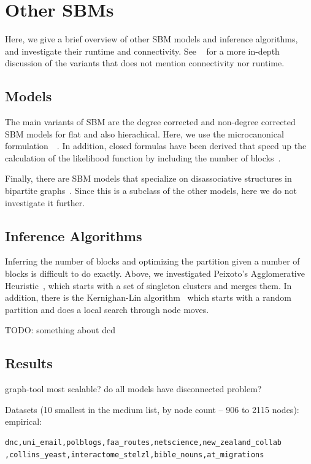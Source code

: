 \documentclass[aps,pre,superscriptaddress]{revtex4}
\begin{document}
\section{Other SBMs}

Here, we give a brief overview of other SBM models and inference algorithms, and investigate their runtime and connectivity.
See ~\cite{funke19-04} for a more in-depth discussion of the variants that does not mention connectivity nor runtime.

\subsection*{Models}

The main variants of SBM are the degree corrected and non-degree corrected SBM models for flat and also hierachical.
Here, we use the microcanonical formulation~\cite{peixoto17-01}~\cite{peixoto14-03}.
In addition, closed formulas have been derived that speed up the calculation of the likelihood function by including the number of blocks~\cite{come15-12}.

Finally, there are SBM models that specialize on disassociative structures in bipartite graphs~\cite{yen20-09}.
Since this is a subclass of the other models, here we do not investigate it further.

\subsection*{Inference Algorithms}

Inferring the number of blocks and optimizing the partition given a number of blocks is difficult to do exactly.
Above, we investigated Peixoto's Agglomerative Heuristic~\cite{peixoto14-01}, which starts with a set of singleton clusters and merges them.
In addition, there is the Kernighan-Lin algorithm~\cite{kernighan70-02} which starts with a random partition and does a local search through node moves.

TODO: something about dcd

\subsection*{Results}

graph-tool most scalable?
do all models have disconnected problem?

Datasets (10 smallest in the medium list, by node count -- 906 to 2115 nodes):
empirical: 
\begin{verbatim}
dnc,uni_email,polblogs,faa_routes,netscience,new_zealand_collab
,collins_yeast,interactome_stelzl,bible_nouns,at_migrations    
\end{verbatim}
\end{document}
